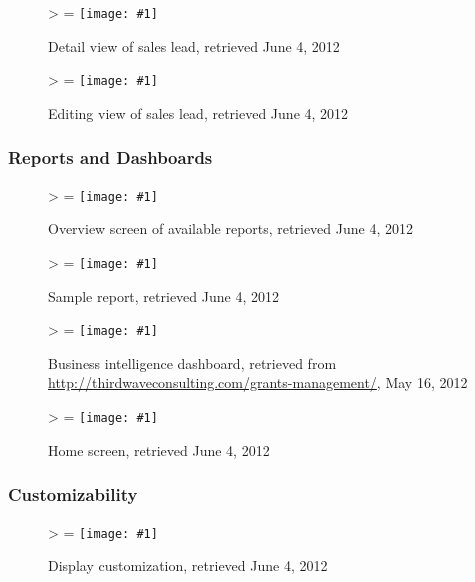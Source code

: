 \documentclass[12pt,letterpaper]{article}
\newlength{\imgwidth}
\newlength{\imgheight}
\newlength{\finalwidth}
\newlength{\finalheight}
\newlength{\imgtextheight}
\newcommand\scalegraphics[1]{%
	\settowidth{\imgwidth}{\texttt{[image: \#1]}}%
	\settoheight{\imgheight}{\texttt{[image: \#1]}}%
	\ifnum\imgwidth>\imgheight \def\imgangle{90} \else \def\imgangle{0} \fi%
	\setlength{\imgtextheight}{0.74\textheight}%
	\setlength{\finalwidth}{\minof{\imgwidth}{\textwidth}}%
	\setlength{\finalheight}{\minof{\imgheight}{\imgtextheight}}%
	\ifnum\finalwidth=\imgwidth \def\imgangle{0} \fi%
	\texttt{[image: \#1]}%
}
\newcommand{\downloadDate}{May 16, 2012}
\begin{document}
\begin{figure}[htbp]
	\centering
	\scalegraphics{./img/force/frce_lead_detail}
	\caption[salesforce.com: Detail view of sales lead]{Detail view of sales lead, retrieved June 4, 2012}
\end{figure}

\begin{figure}[htbp]
	\centering
	\scalegraphics{./img/force/frce_lead_creation}
	\caption[salesforce.com: Editing view of sales lead]{Editing view of sales lead, retrieved June 4, 2012}
\end{figure}

\newpage
\FloatBarrier
\subsubsection{Reports and Dashboards}
\begin{figure}[htbp]
	\centering
	\scalegraphics{./img/force/frce_report_list}
	\caption[salesforce.com: Overview screen of available reports]{Overview screen of available reports, retrieved June 4, 2012}
\end{figure}

\begin{figure}[htbp]
	\centering
	\scalegraphics{./img/force/frce_report}
	\caption[salesforce.com: Sample report]{Sample report, retrieved June 4, 2012}
\end{figure}

\begin{figure}[htbp]
	\centering
	\scalegraphics{./img/force/frce_dashboard}
	\caption[salesforce.com: Business intelligence dashboard]{Business intelligence dashboard, retrieved from \url{http://thirdwaveconsulting.com/grants-management/}, \downloadDate}
\end{figure}

\begin{figure}[htbp]
	\centering
	\scalegraphics{./img/force/frce_home}
	\caption[salesforce.com: Home screen]{Home screen, retrieved June 4, 2012}
\end{figure}

\newpage
\FloatBarrier
\subsubsection{Customizability}
\begin{figure}[htbp]
	\centering
	\scalegraphics{./img/force/frce_customize}
	\caption[salesforce.com: Display customization]{Display customization, retrieved June 4, 2012}
\end{figure}
\end{document}
